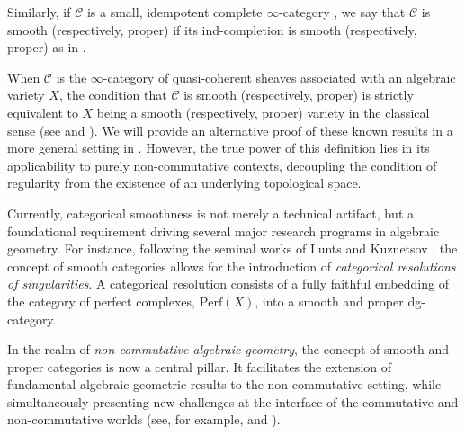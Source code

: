 \documentclass[oneside, hidelinks, 12pt, a4paper,reqno]{amsart}
\theoremstyle{plain}
\theoremstyle{definition}
\theoremstyle{plain}
\newcommand{\Perf}{\mathrm{Perf}}
\newcommand{\cat}{$\infty$-category }
\begin{document}
Similarly, if $\mathscr{C}$ is a small, idempotent complete \cat, we say that $\mathscr{C}$ is smooth (respectively, proper) if its ind-completion is smooth (respectively, proper) as in .

When $\mathscr{C}$ is the \cat of quasi-coherent sheaves associated with an algebraic variety $X$, the condition that $\mathscr{C}$ is smooth (respectively, proper) is strictly equivalent to $X$ being a smooth (respectively, proper) variety in the classical sense (see \cite{lunts2009categoricalresolutionsingularities} and \cite{bondal2002generatorsrepresentabilityfunctorscommutative}). We will provide an alternative proof of these known results in a more general setting in . However, the true power of this definition lies in its applicability to purely non-commutative contexts, decoupling the condition of regularity from the existence of an underlying topological space.


Currently, categorical smoothness is not merely a technical artifact, but a foundational requirement driving several major research programs in algebraic geometry. For instance, following the seminal works of Lunts \cite{lunts2009categoricalresolutionsingularities} and Kuznetsov \cite{kuznetsov2015categorical}, the concept of smooth categories allows for the introduction of \emph{categorical resolutions of singularities}. A categorical resolution consists of a fully faithful embedding of the category of perfect complexes, $\Perf(X)$, into a smooth and proper dg-category.

In the realm of \emph{non-commutative algebraic geometry}, the concept of smooth and proper categories is now a central pillar. It facilitates the extension of fundamental algebraic geometric results to the non-commutative setting, while simultaneously presenting new challenges at the interface of the commutative and non-commutative worlds (see, for example, \cite{perry2019noncommutative} and \cite{beraldo2024proofdelignemilnorconjecture}). 
  
\end{document}
